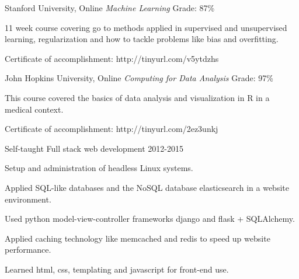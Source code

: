 

\begin{cventries}

\cventry
  {Stanford University, Online} %
  {\textit{Machine Learning}}
  {Grade: 87\%} %
  {} %
  {
    \begin{cvitems} %
      \item {11 week course covering go to methods applied in supervised and unsupervised learning, regularization and how to tackle problems like bias and overfitting.}
      \item {Certificate of accomplishment: http://tinyurl.com/v5ytdzhs}
    \end{cvitems}
  }

\cventry
  {John Hopkins University, Online} %
  {\textit{Computing for Data Analysis}} %
  {Grade: 97\%} %
  {} %
  {
    \begin{cvitems} %
      \item {This course covered the basics of data analysis and visualization in R in a medical context.}
      \item {Certificate of accomplishment: http://tinyurl.com/2ez3unkj}
    \end{cvitems}
  }

\cventry
  {Self-taught} %
  {Full stack web development} %
  {2012-2015} %
  {} %
  {
    \begin{cvitems} %
      \item {Setup and administration of headless Linux systems.}
      \item {Applied SQL-like databases and the NoSQL database elasticsearch in a website environment.}
      \item {Used python model-view-controller frameworks django and flask + SQLAlchemy.}
      \item {Applied caching technology like memcached and redis to speed up website performance.}
      \item {Learned html, css, templating and javascript for front-end use.}
    \end{cvitems}
  }
\end{cventries}
